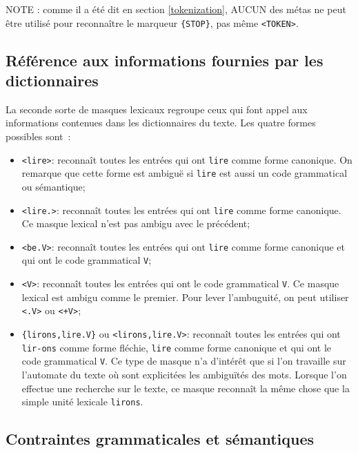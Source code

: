 \bigskip
\noindent NOTE : comme il a été dit en section \ref{tokenization}, AUCUN des métas ne peut être utilisé pour reconnaître le marqueur \verb+{STOP}+, pas même \verb+<TOKEN>+.

\subsection{Référence aux informations fournies par les dictionnaires}

La seconde sorte de masques lexicaux regroupe ceux qui font appel aux informations contenues
dans les dictionnaires du texte. Les quatre formes possibles sont~:


\bigskip
\begin{itemize}
\item \verb+<lire>+: reconnaît toutes les entrées qui ont \verb+lire+ comme forme canonique.
	On remarque que cette forme est ambiguë si \verb+lire+ est aussi un code grammatical ou
	sémantique;
  \item \verb+<lire.>+: reconnaît toutes les entrées qui ont \verb+lire+ comme forme canonique.
  	  Ce masque lexical n'est pas ambigu avec le précédent;
  \item \verb+<be.V>+: reconnaît toutes les entrées qui ont \verb+lire+ comme forme canonique
                       et qui ont le code grammatical  \verb+V+;
  \item \verb+<V>+: reconnaît toutes les entrées qui ont le code grammatical \verb+V+.
  	  Ce masque lexical est ambigu comme le premier. Pour lever l'ambuguité, on peut utiliser
  	  \verb+<.V>+ ou \verb$<+V>$;
\item \verb+{lirons,lire.V}+ ou \verb+<lirons,lire.V>+: reconnaît toutes les entrées qui ont
	\verb+lir-+\newline\verb+ons+ comme forme fléchie, \verb+lire+ comme forme canonique et qui
	ont le code grammatical
  \verb+V+. Ce type de masque n’a d’intérêt que si l’on travaille sur l’automate du texte où sont
  explicitées les ambiguïtés des mots.
   Lorsque l’on effectue une recherche sur
le texte, ce masque reconnaît la même chose que la simple unité lexicale \verb+lirons+.
\end{itemize}

\subsection{Contraintes grammaticales et sémantiques}

